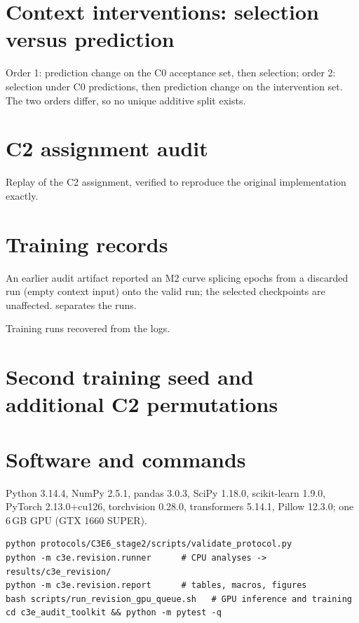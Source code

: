 \documentclass[10pt,a4paper]{article}
\begin{document}
\section{Context interventions: selection versus prediction}\label{ssec:context}
Order 1: prediction change on the C0 acceptance set, then selection; order 2:
selection under C0 predictions, then prediction change on the intervention set.
The two orders differ, so no unique additive split exists.
\small

\normalsize

\section{C2 assignment audit}\label{ssec:c2}
\begin{table}[h]\centering\small
\caption{Replay of the C2 assignment, verified to reproduce the original
implementation exactly.}\label{stab:c2}

\end{table}

\section{Training records}\label{ssec:training}
An earlier audit artifact reported an M2 curve splicing epochs from a discarded
run (empty context input) onto the valid run; the selected checkpoints are
unaffected.  separates the runs.
\begin{table}[h]\centering\small
\caption{Training runs recovered from the logs.}\label{stab:stage6}
\begin{adjustbox}{max width=\linewidth}\end{adjustbox}
\end{table}

\section{Second training seed and additional C2 permutations}\label{ssec:gpu}


\section{Software and commands}\label{ssec:software}
Python 3.14.4, NumPy 2.5.1, pandas 3.0.3, SciPy 1.18.0, scikit-learn 1.9.0,
PyTorch 2.13.0+cu126, torchvision 0.28.0, transformers 5.14.1, Pillow 12.3.0;
one 6\,GB GPU (GTX 1660 SUPER).
\begin{verbatim}
python protocols/C3E6_stage2/scripts/validate_protocol.py
python -m c3e.revision.runner      # CPU analyses -> results/c3e_revision/
python -m c3e.revision.report      # tables, macros, figures
bash scripts/run_revision_gpu_queue.sh   # GPU inference and training
cd c3e_audit_toolkit && python -m pytest -q
\end{verbatim}
\end{document}
